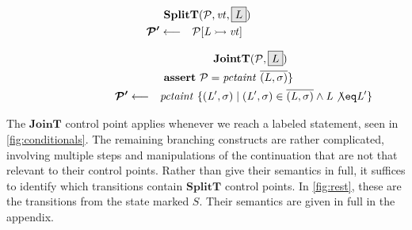 \documentclass[acmsmall,review,anonymous]{acmart}\settopmatter{printfolios=true,printccs=false,printacmref=false}
\begin{document}
\begin{minipage}[t]{.25\textwidth}
\[\begin{aligned}
\truledef{\splitt}
\settag{\PCT'}{\PCT[L \rightarrowtail \vt]}
\end{aligned}\]
\end{minipage}
\begin{minipage}[t]{.74\textwidth}
\[\begin{aligned}
\truledef{\joint}
\assert{\PCT = \mathit{pctaint} ~ \overline{(L,\sigma)}\}}
\settag{\PCT'}{\mathit{pctaint} ~ \{(L',\sigma) \mid (L',\sigma) \in \overline{(L,\sigma)} \land L \not \eq L'\}}
\end{aligned}\]
\end{minipage}

The \(\mathbf{JoinT}\) control point applies whenever we reach a labeled statement, seen
in \cref{fig:conditionals}.
The remaining branching constructs are rather complicated, involving multiple steps
and manipulations of the continuation that are not that relevant to their control
points. Rather than give their semantics in full, it suffices to identify which
transitions contain \(\mathbf{SplitT}\) control points. In \cref{fig:rest}, these
are the transitions from the state marked \(S\). Their semantics are given in full
in the appendix.
\end{document}

